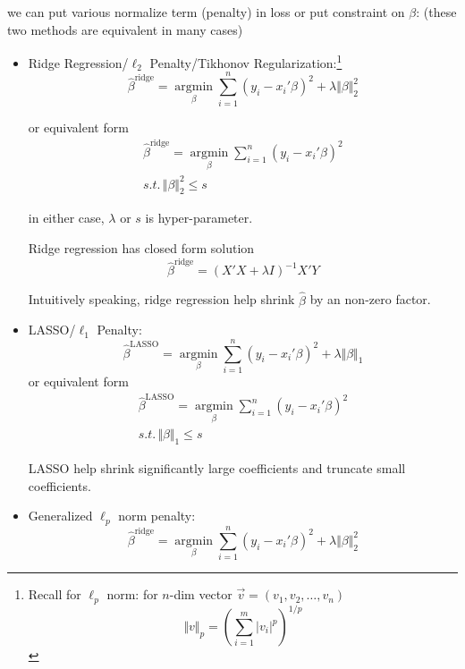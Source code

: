     we can put various normalize term (penalty) in loss or put constraint on $ \beta  $: (these two methods are equivalent in many cases)
    \begin{itemize}[topsep=2pt,itemsep=0pt]
        \item {}Ridge Regression/$ \ell_2 $ Penalty/Tikhonov Regularization:\footnote{Recall for $ \ell_p $ norm: for $ n $-dim vector $ \vec{v}=(v_{1},v_{2},\ldots,v_{n})  $
        \[
             \Vert v \Vert_p=\left(\sum_{i=1}^m|v_i|^p\right)^{1/p} 
        \]
        
        }
        \[
            \hat{\beta }^\mathrm{ridge}=\mathop{\arg\min}\limits_{\beta } \sum_{i=1}^n(y_i-x_i'\beta )^2+ \lambda \Vert \beta  \Vert _2^2 
        \]

        or equivalent form 
        \begin{align}
            \hat{\beta }^\mathrm{ridge}=\mathop{\arg\min}\limits_{\beta } \sum_{i=1}^n(y_i-x_i'\beta )^2 \\
            s.t.\,\Vert \beta  \Vert _2^2\leq s
        \end{align}
        
        in either case, $ \lambda  $ or $ s $ is hyper-parameter.

        Ridge regression has closed form solution
        \[
            \hat{\beta }^\mathrm{ridge}=(X'X+\lambda I)^{-1}X'Y  
        \]

        Intuitively speaking, ridge regression help shrink $ \hat{\beta } $ by an non-zero factor.
        \item LASSO/$ \ell_1 $ Penalty:
        \[
            \hat{\beta }^\mathrm{LASSO}=\mathop{\arg\min}\limits_{\beta } \sum_{i=1}^n(y_i-x_i'\beta )^2+ \lambda \Vert \beta  \Vert _1 
        \]
        or equivalent form 
        \begin{align}
            \hat{\beta }^\mathrm{LASSO}=\mathop{\arg\min}\limits_{\beta } \sum_{i=1}^n(y_i-x_i'\beta )^2 \\
            s.t.\,\Vert \beta  \Vert _1\leq s
        \end{align}

        LASSO help shrink significantly large coefficients and truncate small coefficients.
        
        \item Generalized $ \ell_p $ norm penalty: 
        \[
            \hat{\beta }^\mathrm{ridge}=\mathop{\arg\min}\limits_{\beta } \sum_{i=1}^n(y_i-x_i'\beta )^2+ \lambda \Vert \beta  \Vert _2^2 
        \]


\end{itemize}
